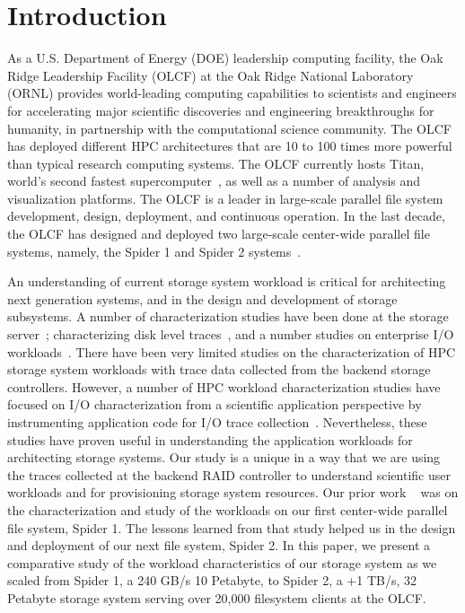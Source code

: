 \section{Introduction}
\label{sec:intro}

As a U.S. Department of Energy (DOE) leadership computing facility, the Oak
Ridge Leadership Facility (OLCF) at the Oak Ridge National Laboratory (ORNL)
provides world-leading computing capabilities to scientists and engineers for
accelerating major scientific discoveries and engineering breakthroughs for
humanity, in partnership with the computational science community. The OLCF has
deployed different HPC architectures that are 10 to 100 times more powerful
than typical research computing systems. The OLCF currently hosts Titan,
world's second fastest supercomputer~\cite{titan}, as well as a
number of analysis and visualization platforms. The OLCF is a leader in large-scale
parallel file system development, design, deployment, and continuous operation. In the
last decade, the OLCF has designed and deployed two large-scale center-wide
parallel file systems, namely, the Spider 1 and Spider 2 systems~\cite{spider1,
spider2}.

An understanding of current storage system workload is critical for
architecting next generation systems, and in the design and development of
storage subsystems. A number of characterization studies have been done at the
storage server~\cite{hpca04:zhang, iiswc08:swaroop}; characterizing disk level
traces~\cite{ sigmetrics09:alma}, and a number studies on enterprise I/O
workloads~\cite{gmach2007workload, hpca04:zhang}. There have been very limited
studies on the characterization of HPC storage system workloads with trace
data collected from the backend storage controllers. However, a number of HPC
workload characterization studies have focused on I/O characterization from a
scientific application perspective by instrumenting application code for I/O
trace collection~\cite{Carns:2011, shan2008characterizing}. Nevertheless,
these studies have proven useful in understanding the application workloads
for architecting storage systems. Our study is a unique in a way that we are
using the traces collected at the backend RAID controller to understand
scientific user workloads and for provisioning storage system resources. Our
prior work ~\cite{ spider1-workload} was on the characterization and study of
the workloads on our first center-wide parallel file system, Spider 1. The
lessons learned from that study helped us in the design and deployment of our
next file system, Spider 2. In this paper, we present a comparative study of
the workload characteristics of our storage system as we scaled from Spider 1,
a 240 GB/s 10 Petabyte, to Spider 2, a +1 TB/s, 32 Petabyte storage system
serving over 20,000 filesystem clients at the OLCF.

